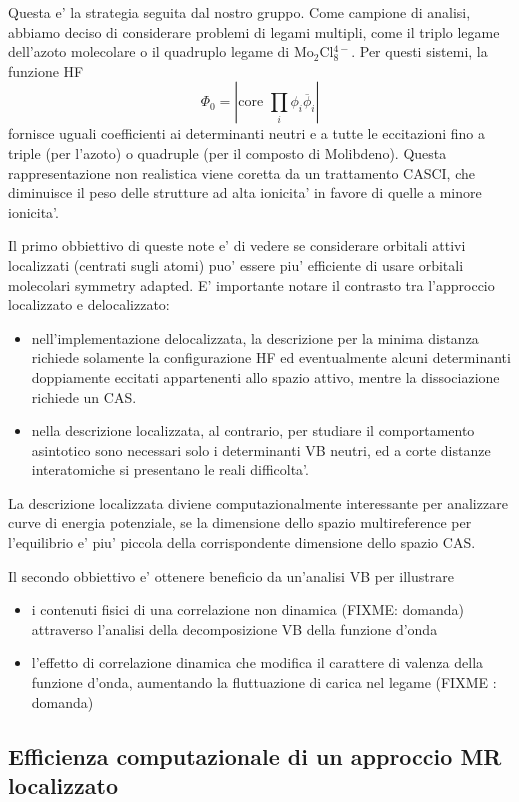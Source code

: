Questa e' la strategia seguita dal nostro gruppo. Come campione di
analisi, abbiamo deciso di considerare problemi di legami multipli,
come il triplo legame dell'azoto molecolare o il quadruplo legame di
Mo${}_2$Cl${}_8^{4-}$.  Per questi sistemi, la funzione HF 
$$ 
\Phi_0 = \left| \mbox{core }\prod_i \phi_i\overline{\phi}_i \right|
$$
fornisce uguali coefficienti ai determinanti neutri e a tutte le
eccitazioni fino a triple (per l'azoto) o quadruple (per il composto
di Molibdeno).  Questa rappresentazione non realistica viene coretta
da un trattamento CASCI, che diminuisce il peso delle strutture ad
alta ionicita' in favore di quelle a minore ionicita'.

Il primo obbiettivo di queste note e' di vedere se considerare orbitali
attivi localizzati (centrati sugli atomi) puo' essere piu' efficiente
di usare orbitali molecolari symmetry adapted.  E' importante notare il
contrasto tra l'approccio localizzato e delocalizzato:
\begin{itemize}
\item nell'implementazione delocalizzata, la descrizione per
la minima distanza richiede solamente la configurazione HF ed
eventualmente alcuni determinanti doppiamente eccitati appartenenti
allo spazio attivo, mentre la dissociazione richiede un CAS. \\
\item nella descrizione localizzata, al contrario, per studiare il
comportamento asintotico sono necessari solo i determinanti VB neutri,
ed a corte distanze interatomiche si presentano le reali difficolta'.
\end{itemize} 
La descrizione localizzata diviene computazionalmente
interessante per analizzare curve di energia potenziale, se la
dimensione dello spazio multireference per l'equilibrio e' piu'
piccola della corrispondente dimensione dello spazio CAS.

Il secondo obbiettivo e' ottenere beneficio da un'analisi VB per
illustrare 
\begin{itemize} 
\item i contenuti fisici di una correlazione non dinamica (FIXME:
domanda) attraverso l'analisi della decomposizione VB della funzione
d'onda \\
\item l'effetto di correlazione dinamica
che modifica il carattere di valenza della funzione d'onda, aumentando
la fluttuazione di carica nel legame (FIXME : domanda)
\end{itemize}
\subsection{Efficienza computazionale di un approccio MR localizzato}





